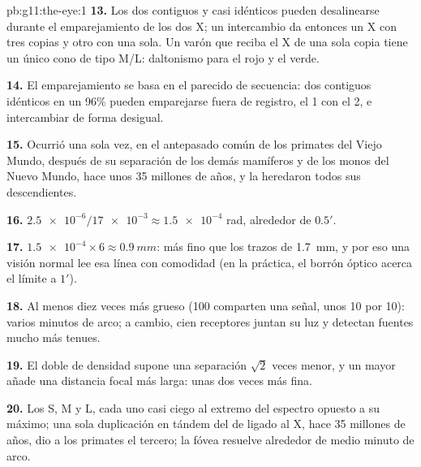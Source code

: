 \begin{solution}{pb:g11:the-eye:1}
\textbf{13.} Los dos  contiguos y casi idénticos pueden
desalinearse durante el emparejamiento de los dos  X; un
intercambio da entonces un X con tres copias y otro con una sola. Un
varón que reciba el X de una sola copia tiene un único cono de tipo
M/L: daltonismo para el rojo y el verde.

\textbf{14.} El emparejamiento se basa en el parecido de secuencia: dos
 contiguos idénticos en un 96\% pueden emparejarse fuera de
registro, el  1 con el  2, e intercambiar de forma desigual.

\textbf{15.} Ocurrió una sola vez, en el antepasado común de los
primates del Viejo Mundo, después de su separación de los demás
mamíferos y de los monos del Nuevo Mundo, hace unos 35 millones de
años, y la heredaron todos sus descendientes.

\textbf{16.} $\num{2.5e-6}/\num{17e-3} \approx \num{1.5e-4}$ rad,
alrededor de $0.5'$.

\textbf{17.} $\num{1.5e-4} \times 6 \approx \qty{0.9}{mm}$: más fino
que los trazos de \qty{1.7}{mm}, y por eso una visión normal lee esa
línea con comodidad (en la práctica, el borrón óptico acerca el límite
a $1'$).

\textbf{18.} Al menos diez veces más grueso (100  comparten una
señal, unos 10 por 10): varios minutos de arco; a cambio, cien
receptores juntan su luz y detectan fuentes mucho más tenues.

\textbf{19.} El doble de densidad supone una separación $\sqrt{2}$
veces menor, y un  mayor añade una distancia focal más larga: unas
dos veces más fina.

\textbf{20.} Los  S, M y L, cada uno casi ciego al extremo del
espectro opuesto a su máximo; una sola duplicación en tándem del  de
 ligado al X, hace 35 millones de años, dio a los primates el
tercero; la fóvea resuelve alrededor de medio minuto de arco.
\end{solution}
